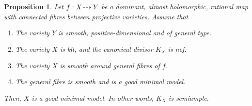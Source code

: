 \documentclass[JEP,XML,SOM,Unicode,published]{cedram}
\newenvironment{enumeraten}
{\begin{enumerate}\setcounter{enumi}{\value{equation}}\itemindent0pt}
{\setcounter{equation}{\value{enumi}}\end{enumerate}}
\newcommand{\dradpl}{{\hspace*{-2.5mm}\begin{tikzcd}[ampersand replacement=\&,column sep = scriptsize]\mbox{}\ar[r,dashed]\&\mbox{}\end{tikzcd}\hspace*{-2.5mm}}}
\newcommand{\dratst}{{\hspace*{-2.5mm}\begin{tikzcd}[ampersand replacement=\&,column sep = small]\mbox{}\ar[r,dashed]\&\mbox{}\end{tikzcd}\hspace*{-2mm}}}
\let\drascst\dratst
\newcommand{\dra}{\mathchoice{\dradpl}{\dratst}{\drascst}{\drascst}}
\let\dasharrow\dra
\theoremstyle{plain}
\newtheorem{prop}[thm]{Proposition}
\theoremstyle{definition}
\numberwithin{equation}{thm}
\numberwithin{enumi}{thm}
\begin{document}
\begin{prop}\label{prop:abundance}
Let $f : X \dasharrow Y$ be a dominant, almost holomorphic, rational map with
connected fibres between projective varieties. Assume that
\begin{enumeraten}
\item\label{il:AS1} The variety $Y$ is smooth, positive-dimensional and of
general type.

\item\label{il:AS2} The variety $X$ is klt, and the canonical divisor $K_X$ is
nef.

\item\label{il:AS3} The variety $X$ is smooth around general fibres of $f$.

\item\label{il:AS4} The general fibre is smooth and is a good minimal model.
\end{enumeraten}
Then, $X$ is a good minimal model. In other words, $K_X$ is semiample.
\end{prop}
\end{document}
